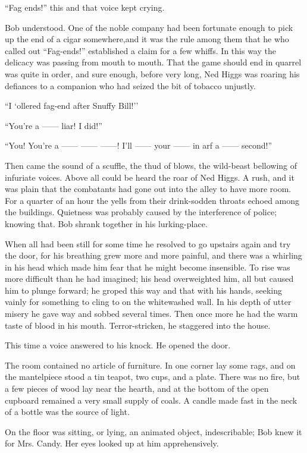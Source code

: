``Fag ends!'' this and that voice kept crying.

Bob understood. One of the noble company had been fortunate enough to
pick up the end of a cigar somewhere,and it was the rule among them that
he who called out ``Fag-ends!'' established a claim for a few whiffs. In
this way the delicacy was passing from mouth to mouth. That the game
should end {}in quarrel was quite in order, and sure enough, before very
long, Ned Higgs was roaring his defiances to a companion who had seized
the bit of tobacco unjustly.

``I `ollered fag-end after Snuffy Bill!''

``You're a {{------}} liar! I did!''

``You! You're a {{------}} {{------}} {{------}}! I'll {{------}} your
{{------}} in arf a {{------}} second!''

Then came the sound of a scuffle, the thud of blows, the wild-beast
bellowing of infuriate voices. Above all could be heard the roar of Ned
Higgs. A rush, and it was plain that the combatants had gone out into
the alley to have more room. For a quarter of an hour the yells from
their drink-sodden throats echoed among the buildings. Quietness was
probably caused by the interference of police; knowing that. Bob shrank
together in his lurking-place.

When all had been still for some time he resolved to go upstairs again
and try the door, for his breathing grew more and more painful, and
there was a whirling in his head which made him fear that he might
become insensible. To rise was more difficult than he had imagined; his
head overweighted him, all but caused him to plunge forward; he groped
this {}way and that with his hands, seeking vainly for something to
cling to on the whitewashed wall. In his depth of utter misery he gave
way and sobbed several times. Then once more he had the warm taste of
blood in his mouth. Terror-stricken, he staggered into the house.

This time a voice answered to his knock. He opened the door.

The room contained no article of furniture. In one corner lay some rags,
and on the mantelpiece stood a tin teapot, two cups, and a plate. There
was no fire, but a few pieces of wood lay near the hearth, and at the
bottom of the open cupboard remained a very small supply of coals. A
candle made fast in the neck of a bottle was the source of light.

On the floor was sitting, or lying, an animated object, indescribable;
Bob knew it for Mrs. Candy. Her eyes looked up at him apprehensively.

